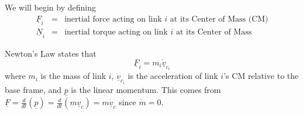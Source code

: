\documentclass[fleqn]{article}
\begin{document}
We will begin by defining
\begin{eqnarray}
	\underline{F}_{i} & = & \text{inertial force acting on link $i$ at its Center of Mass (CM)} \nonumber \\
	\underline{N}_{i} & = & \text{inertial torque acting on link $i$ at its Center of Mass} \nonumber
\end{eqnarray}

Newton's Law states that
\begin{displaymath}
	\underline{F}_{i} = m_{i}\underline{\dot{v}}_{c_{i}}
\end{displaymath}
where $m_{i}$ is the mass of link $i$, $\underline{\dot{v}}_{c_{i}}$ is the acceleration of link $i$'s CM relative to the base frame, and $\underline{p}$ is the linear momentum. This comes from $\underline{F} = \frac{d}{dt}(\underline{p}) = \frac{d}{dt}(m\underline{v}_{c}) = m\dot{\underline{v}}_{c}$ since $\dot{m}=0$.
\end{document}
